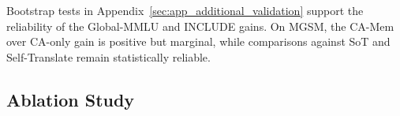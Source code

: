 \documentclass[11pt]{article}
\begin{document}
Bootstrap tests in Appendix~\ref{sec:app_additional_validation} support the reliability of the Global-MMLU and INCLUDE gains. On MGSM, the CA-Mem over CA-only gain is positive but marginal, while comparisons against SoT and Self-Translate remain statistically reliable.



\subsection{Ablation Study}



\end{document}
